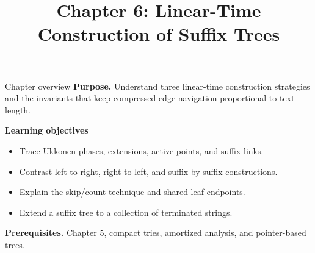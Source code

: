 \documentclass[11pt,letterpaper]{article}
\title{Chapter 6: Linear-Time Construction of Suffix Trees}
\author{}
\date{}
\begin{document}
\maketitle

\begin{CornellOverviewBox}{Chapter overview}
\textbf{Purpose.} Understand three linear-time construction strategies and the invariants that keep compressed-edge navigation proportional to text length.

\textbf{Learning objectives}
\begin{itemize}
  \item Trace Ukkonen phases, extensions, active points, and suffix links.
  \item Contrast left-to-right, right-to-left, and suffix-by-suffix constructions.
  \item Explain the skip/count technique and shared leaf endpoints.
  \item Extend a suffix tree to a collection of terminated strings.
\end{itemize}

\textbf{Prerequisites.} Chapter 5, compact tries, amortized analysis, and pointer-based trees.
\end{CornellOverviewBox}
\end{document}
